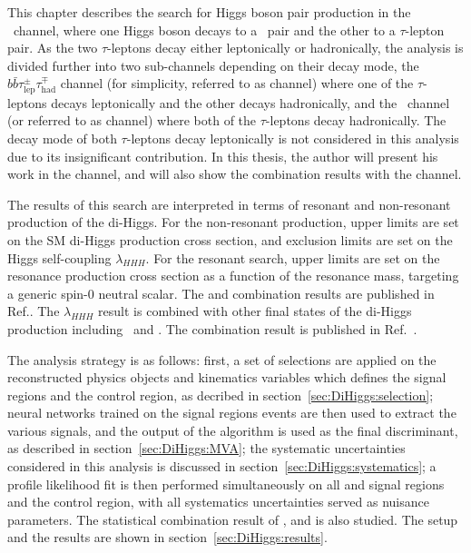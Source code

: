 This chapter describes the search for Higgs boson pair production in the
\bbtt\ channel, where one Higgs boson decays to a \bquark\ pair 
and the other to a $\tau$-lepton pair. 
As the two $\tau$-leptons decay either leptonically or hadronically, 
the analysis is divided further into two sub-channels depending on
their decay mode, 
the $b\bar{b}\tau_{\text{lep}}^{\pm}\tau_{\text{had}}^{\mp}$ channel 
(for simplicity, referred to as \lephad channel)
where one of the $\tau$-leptons decays leptonically and the other decays
hadronically, 
and the \bbtthh\ channel (or referred to as \hadhad channel) 
where both of the $\tau$-leptons decay hadronically. 
The decay mode of both $\tau$-leptons decay
leptonically is not considered in this analysis 
due to its insignificant contribution. 
In this thesis, the author will present his work 
in the \lephad channel, and will also show the combination results with 
the \hadhad channel.


The results of this search are interpreted in terms of resonant and 
non-resonant production of the di-Higgs.
For the non-resonant production, upper limits are set on the SM di-Higgs production
cross section, and exclusion limits are set on the Higgs self-coupling $\lambda_{HHH}$.
For the resonant search, upper limits are set on the resonance production cross section 
as a function of the resonance mass, targeting a generic spin-0 neutral scalar. 
The \lephad and \hadhad
combination results are published in Ref.\cite{dihiggs-conf}.
The $\lambda_{HHH}$ result is combined with other final states of the di-Higgs production
including \bbbb\ and \bbyy. 
The combination result is published in Ref.~\cite{ATLAS-CONF-2021-052}. 

The analysis strategy is as follows:
first, a set of selections are applied on 
the reconstructed physics objects and kinematics variables which
defines the signal regions and the control region, 
as decribed in section~\ref{sec:DiHiggs:selection};
neural networks trained on the signal regions events are then 
used to extract the various signals, and the output of the algorithm is used
as the final discriminant, as described in section~\ref{sec:DiHiggs:MVA};
the systematic uncertainties considered in this analysis is discussed in 
section~\ref{sec:DiHiggs:systematics};
a profile likelihood fit is then performed simultaneously on all \lephad and \hadhad
signal regions and the control region, with all systematics uncertainties served as nuisance parameters.
The statistical combination result of \bbtt, \bbyy and \bbbb is also studied. 
The setup and the results are shown in section~\ref{sec:DiHiggs:results}.

